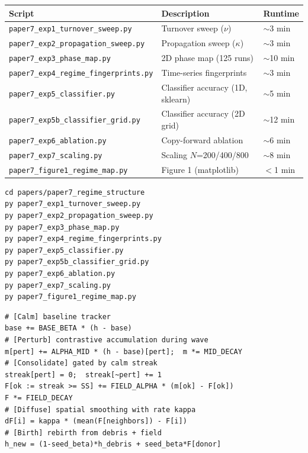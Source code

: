 \documentclass[11pt]{article}
\theoremstyle{remark}
\begin{document}
\begin{center}
\begin{tabular}{lll}
\toprule
Script & Description & Runtime \\
\midrule
\texttt{paper7\_exp1\_turnover\_sweep.py}      & Turnover sweep ($\nu$)        & $\sim$3 min \\
\texttt{paper7\_exp2\_propagation\_sweep.py}   & Propagation sweep ($\kappa$)  & $\sim$3 min \\
\texttt{paper7\_exp3\_phase\_map.py}           & 2D phase map (125 runs)       & $\sim$10 min \\
\texttt{paper7\_exp4\_regime\_fingerprints.py} & Time-series fingerprints      & $\sim$3 min \\
\texttt{paper7\_exp5\_classifier.py}           & Classifier accuracy (1D, sklearn) & $\sim$5 min \\
\texttt{paper7\_exp5b\_classifier\_grid.py}   & Classifier accuracy (2D grid)     & $\sim$12 min \\
\texttt{paper7\_exp6\_ablation.py}             & Copy-forward ablation             & $\sim$6 min \\
\texttt{paper7\_exp7\_scaling.py}              & Scaling $N$=200/400/800           & $\sim$8 min \\
\texttt{paper7\_figure1\_regime\_map.py}       & Figure 1 (matplotlib)             & $<$1 min \\
\bottomrule
\end{tabular}
\end{center}

\begin{lstlisting}[caption={Run all experiments (results cached after first run).
Requires: numpy for Exp1-4,7; numpy + scikit-learn for Exp5/5b; matplotlib for Figure 1.}]
cd papers/paper7_regime_structure
py paper7_exp1_turnover_sweep.py
py paper7_exp2_propagation_sweep.py
py paper7_exp3_phase_map.py
py paper7_exp4_regime_fingerprints.py
py paper7_exp5_classifier.py
py paper7_exp5b_classifier_grid.py
py paper7_exp6_ablation.py
py paper7_exp7_scaling.py
py paper7_figure1_regime_map.py
\end{lstlisting}

\begin{lstlisting}[caption={Core VCSM step with variable nu and kappa}]
# [Calm] baseline tracker
base += BASE_BETA * (h - base)
# [Perturb] contrastive accumulation during wave
m[pert] += ALPHA_MID * (h - base)[pert];  m *= MID_DECAY
# [Consolidate] gated by calm streak
streak[pert] = 0;  streak[~pert] += 1
F[ok := streak >= SS] += FIELD_ALPHA * (m[ok] - F[ok])
F *= FIELD_DECAY
# [Diffuse] spatial smoothing with rate kappa
dF[i] = kappa * (mean(F[neighbors]) - F[i])
# [Birth] rebirth from debris + field
h_new = (1-seed_beta)*h_debris + seed_beta*F[donor]
\end{lstlisting}
\end{document}
